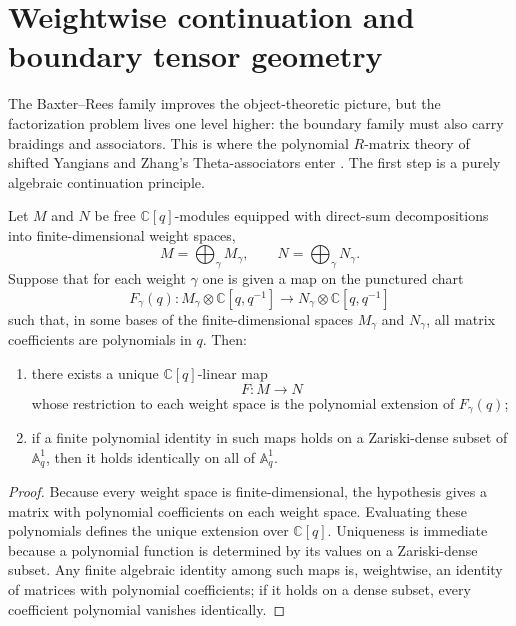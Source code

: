 \section{Weightwise continuation and boundary tensor geometry}
\label{sec:typeA-boundary-tensor-geometry}

The Baxter--Rees family improves the object-theoretic picture, but the
factorization problem lives one level higher: the boundary family must
also carry braidings and associators. This is where the polynomial
$R$-matrix theory of shifted Yangians and Zhang's Theta-associators enter
\cite{HZ24,ZhangTheta24}. The first step is a purely algebraic
continuation principle.

\begin{lemma}
\ClaimStatusProvedHere
\label{lem:weightwise-polynomial-continuation}
Let $M$ and $N$ be free $\mathbb C[q]$-modules equipped with direct-sum
decompositions into finite-dimensional weight spaces,
\begin{equation}
M=\bigoplus_{\gamma} M_\gamma,
\qquad N=\bigoplus_{\gamma} N_\gamma.
\end{equation}
Suppose that for each weight $\gamma$ one is given a map on the punctured
chart
\begin{equation}
F_\gamma(q):M_\gamma\otimes \mathbb C[q,q^{-1}]
\longrightarrow N_\gamma\otimes \mathbb C[q,q^{-1}]
\end{equation}
such that, in some bases of the finite-dimensional spaces $M_\gamma$ and
$N_\gamma$, all matrix coefficients are polynomials in $q$. Then:
\begin{enumerate}
 \item there exists a unique $\mathbb C[q]$-linear map
 \begin{equation}
 F:M\to N
 \end{equation}
 whose restriction to each weight space is the polynomial extension of
 $F_\gamma(q)$;
 \item if a finite polynomial identity in such maps holds on a
 Zariski-dense subset of $\mathbb A^1_q$, then it holds identically on
 all of $\mathbb A^1_q$.
\end{enumerate}
\end{lemma}

\begin{proof}
Because every weight space is finite-dimensional, the hypothesis gives a
matrix with polynomial coefficients on each weight space. Evaluating
these polynomials defines the unique extension over $\mathbb C[q]$.
Uniqueness is immediate because a polynomial function is determined by its
values on a Zariski-dense subset. Any finite algebraic identity among
such maps is, weightwise, an identity of matrices with polynomial
coefficients; if it holds on a dense subset, every coefficient polynomial
vanishes identically.
\end{proof}

